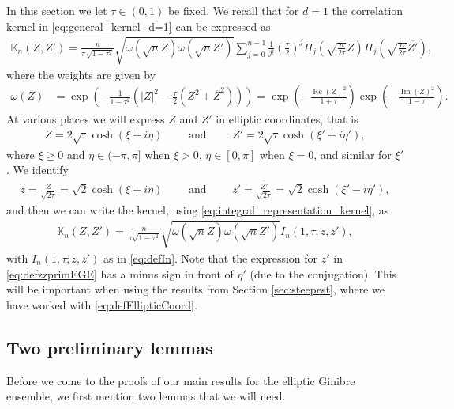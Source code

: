 \documentclass[%
 jmp,
cp,  %
 amsmath,amsthm,amssymb,%
 reprint,%
onecolumn]{revtex4-2}
\begin{document}
In this section we let $\tau\in(0,1)$ be fixed. We recall that for $d=1$  the correlation kernel in \eqref{eq:general_kernel_d=1} can be expressed as 
\begin{align} \label{eq:kernelHermitePols}
\mathbb K_n(Z,Z') = \frac{n}{\pi\sqrt{1-\tau^2}} \sqrt{\omega\left(\sqrt n Z\right) \omega\left(\sqrt n Z'\right)} \sum_{j=0}^{n-1} \frac{1}{j!} \left(\frac{\tau}{2}\right)^j H_j\left(\sqrt{\frac{n}{2 \tau}} Z\right) H_j\left(\sqrt{\frac{n}{2 \tau}} \overline{Z'}\right),
\end{align}
where the weights are given by
\begin{align} \label{weight2}
\omega(Z) &= \exp\left(-\frac{1}{1-\tau^2} \left(|Z|^2 - \frac{\tau}{2} (Z^2+\overline{Z}^2)\right)\right)
= \exp\left(-\frac{\operatorname{Re}(Z)^2}{1+\tau}\right) \exp\left(-\frac{\operatorname{Im}(Z)^2}{1-\tau}\right).
\end{align}
At various places we will express $Z$ and $Z'$ in elliptic coordinates, that is
\begin{align*}
Z = 2\sqrt \tau\cosh(\xi+i\eta) \qquad\text{ and }\qquad Z' = 2\sqrt \tau\cosh(\xi'+i\eta'),
\end{align*}
where $\xi\geq 0$ and $\eta\in (-\pi,\pi]$ when $\xi>0$, $\eta\in [0,\pi]$ when $\xi=0$, and similar for $\xi'$. We identify
\begin{align} \label{eq:defzzprimEGE}
z = \frac{Z}{\sqrt{2\tau}}=\sqrt 2\cosh(\xi+i\eta) \qquad\text{ and }\qquad z' = \frac{\overline{Z'}}{\sqrt{2\tau}}=\sqrt 2\cosh(\xi'-i\eta'),
\end{align}
and then we can write the kernel, using \eqref{eq:integral_representation_kernel}, as
\begin{align} \label{eq:EGEInwithWeights}
\mathbb K_n(Z,Z') = \frac{n}{\pi\sqrt{1-\tau^2}} \sqrt{\omega\left(\sqrt n Z\right) \omega\left(\sqrt n Z'\right)} I_n(1, \tau;z,z'),
\end{align}
with $I_n(1, \tau;z,z')$ as in \eqref{eq:defIn}. Note that the expression for $z'$ in \eqref{eq:defzzprimEGE} has a minus sign in front of $\eta'$ (due to the conjugation). This will be important when using the results from Section \ref{sec:steepest}, where we have worked with \eqref{eq:defEllipticCoord}.

\subsection{Two preliminary lemmas}

Before we come to the proofs of our main results for the elliptic Ginibre ensemble, we first mention two lemmas that we will need. 
\end{document}

